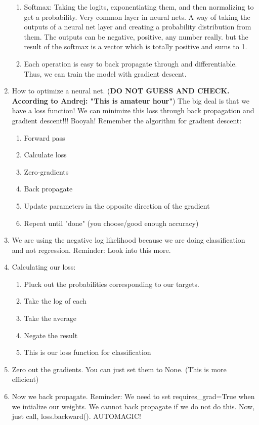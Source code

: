 \documentclass[a4paper, 11pt, oneside]{researchjournal} %
\begin{document}
\begin{enumerate}
\begin{enumerate}
        \item Softmax: Taking the logits, exponentiating them, and then normalizing to get a probability. Very common layer in neural nets. A way of taking the outputs of a neural net layer and creating a probability distribution from them. The outputs can be negative, positive, any number really. but the result of the softmax is a vector which is totally positive and sums to 1. 
        \item Each operation is easy to back propagate through and differentiable. Thus, we can train the model with gradient descent. 
    \end{enumerate}

    \item How to optimize a neural net. (\textbf{DO NOT GUESS AND CHECK. According to Andrej: "This is amateur hour"})
    The big deal is that we have a loss function! We can minimize this loss through back propagation and gradient descent!!! Booyah! Remember the algorithm for gradient descent: 
    \begin{enumerate}
        \item Forward pass
        \item Calculate loss
        \item Zero-gradients 
        \item Back propagate
        \item Update parameters in the opposite direction of the gradient
        \item Repeat until "done" (you choose/good enough accuracy)
    \end{enumerate}
    \item We are using the negative log likelihood because we are doing classification and not regression. Reminder: Look into this more.
    \item Calculating our loss:
    \begin{enumerate}
        \item Pluck out the probabilities corresponding to our targets. 
        \item Take the log of each 
        \item Take the average
        \item Negate the result
        \item This is our loss function for classification
    \end{enumerate}
    \item Zero out the gradients. You can just set them to None. (This is more efficient)
    \item Now we back propagate. Reminder: We need to set requires\_grad=True when we intialize our weights. We cannot back propagate if we do not do this. Now, just call, loss.backward(). AUTOMAGIC!

\end{enumerate}
\end{document}
